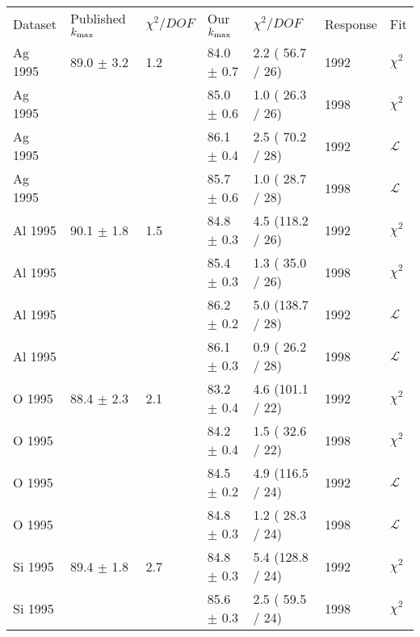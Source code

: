 
\begin{table}[h]
  \begin{center}
    \begin{tabular}{|l||l|l|l|l|l|l|}
      \hline
      Dataset & Published $\mbox{$k_{\rm max}$}$ & $\chi^2 / DOF$ & Our $\mbox{$k_{\rm max}$}$ & $\chi^2 / DOF$  & Response & Fit \\
      \hhline{|=||=|=|=|=|=|=|}


      Ag 1995 & 89.0 $\pm$ 3.2 & 1.2 & 84.0 $\pm$ 0.7 & 2.2 ( 56.7 / 26) & 1992 & $\chi^2$ \\
      Ag 1995 &                &     & 85.0 $\pm$ 0.6 & 1.0 ( 26.3 / 26) & 1998 & $\chi^2$ \\
      Ag 1995 &                &     & 86.1 $\pm$ 0.4 & 2.5 ( 70.2 / 28) & 1992 & $\mathcal{L}$ \\
      Ag 1995 &                &     & 85.7 $\pm$ 0.6 & 1.0 ( 28.7 / 28) & 1998 & $\mathcal{L}$ \\
      \hline
      Al 1995 & 90.1 $\pm$ 1.8 & 1.5 & 84.8 $\pm$ 0.3 & 4.5 (118.2 / 26) & 1992 & $\chi^2$ \\
      Al 1995 &                &     & 85.4 $\pm$ 0.3 & 1.3 ( 35.0 / 26) & 1998 & $\chi^2$ \\
      Al 1995 &                &     & 86.2 $\pm$ 0.2 & 5.0 (138.7 / 28) & 1992 & $\mathcal{L}$ \\
      Al 1995 &                &     & 86.1 $\pm$ 0.3 & 0.9 ( 26.2 / 28) & 1998 & $\mathcal{L}$ \\
      \hline
      O  1995 & 88.4 $\pm$ 2.3 & 2.1 & 83.2 $\pm$ 0.4 & 4.6 (101.1 / 22) & 1992 & $\chi^2$ \\
      O  1995 &                &     & 84.2 $\pm$ 0.4 & 1.5 ( 32.6 / 22) & 1998 & $\chi^2$ \\
      O  1995 &                &     & 84.5 $\pm$ 0.2 & 4.9 (116.5 / 24) & 1992 & $\mathcal{L}$ \\
      O  1995 &                &     & 84.8 $\pm$ 0.3 & 1.2 ( 28.3 / 24) & 1998 & $\mathcal{L}$ \\
      \hline
      Si 1995 & 89.4 $\pm$ 1.8 & 2.7 & 84.8 $\pm$ 0.3 & 5.4 (128.8 / 24) & 1992 & $\chi^2$ \\
      Si 1995 &                &     & 85.6 $\pm$ 0.3 & 2.5 ( 59.5 / 24) & 1998 & $\chi^2$ \\

\end{tabular}
\end{center}
\end{table}
